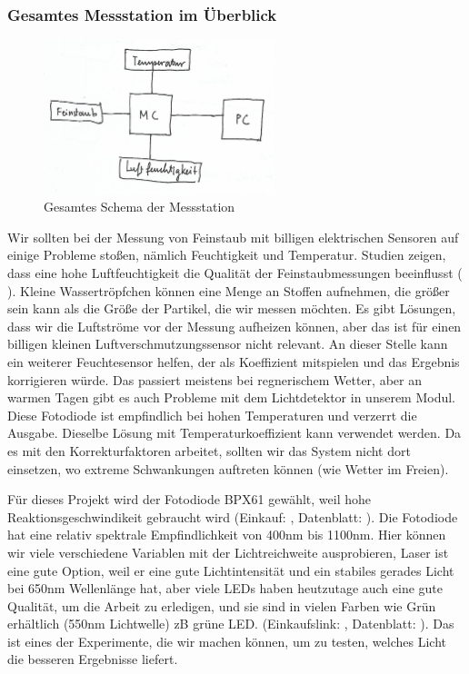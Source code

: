 \documentclass[12pt]{article}
\begin{document}
\subsubsection{Gesamtes Messstation im Überblick}
\begin{figure}[h!]
  \centering
  \label{fig:gesamtschema}
  \includegraphics[width=0.6\textwidth]{gesamtschema}
  \caption{Gesamtes Schema der Messstation}
\end{figure}
Wir sollten bei der Messung von Feinstaub mit billigen elektrischen Sensoren auf einige Probleme stoßen, nämlich Feuchtigkeit und Temperatur. Studien zeigen, dass eine hohe Luftfeuchtigkeit die Qualität der Feinstaubmessungen beeinflusst (\cite{BerndLaquai.2017} ). Kleine Wassertröpfchen können eine Menge an Stoffen aufnehmen, die größer sein kann als die Größe der Partikel, die wir messen möchten. Es gibt Lösungen, dass wir die Luftströme vor der Messung aufheizen können, aber das ist für einen billigen kleinen Luftverschmutzungssensor nicht relevant. An dieser Stelle kann ein weiterer Feuchtesensor helfen, der als Koeffizient mitspielen und das Ergebnis korrigieren würde. Das passiert meistens bei regnerischem Wetter, aber an warmen Tagen gibt es auch Probleme mit dem Lichtdetektor in unserem Modul. Diese Fotodiode ist empfindlich bei hohen Temperaturen und verzerrt die Ausgabe. Dieselbe Lösung mit Temperaturkoeffizient kann verwendet werden. Da es mit den Korrekturfaktoren arbeitet, sollten wir das System nicht dort einsetzen, wo extreme Schwankungen auftreten können (wie Wetter im Freien). 

Für dieses Projekt wird der Fotodiode BPX61 gewählt, weil hohe Reaktionsgeschwindikeit gebraucht wird (Einkauf: \cite{Conrad.8312021}, Datenblatt: \cite{OSRAM.2014}). Die Fotodiode hat eine relativ spektrale Empfindlichkeit von 400nm bis 1100nm. Hier können wir viele verschiedene Variablen mit der Lichtreichweite ausprobieren, Laser ist eine gute Option, weil er eine gute Lichtintensität und ein stabiles gerades Licht bei 650nm Wellenlänge hat, aber viele LEDs haben heutzutage auch eine gute Qualität, um die Arbeit zu erledigen, und sie sind in vielen Farben wie Grün erhältlich (550nm Lichtwelle) zB grüne LED. (Einkaufslink: \cite{LEDAma}, Datenblatt: \cite{Alldatasheet.8282021}). Das ist eines der Experimente, die wir machen können, um zu testen, welches Licht die besseren Ergebnisse liefert.
\end{document}
